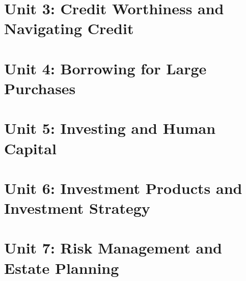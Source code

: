 \documentclass[12pt]{article}
\begin{document}
    \section {Unit 3: Credit Worthiness and Navigating Credit}

    \section{Unit 4: Borrowing for Large Purchases}

    \section{Unit 5: Investing and Human Capital}
    
    \section{Unit 6: Investment Products and Investment Strategy}

    \section{Unit 7: Risk Management and Estate Planning}
    
\end{document}

